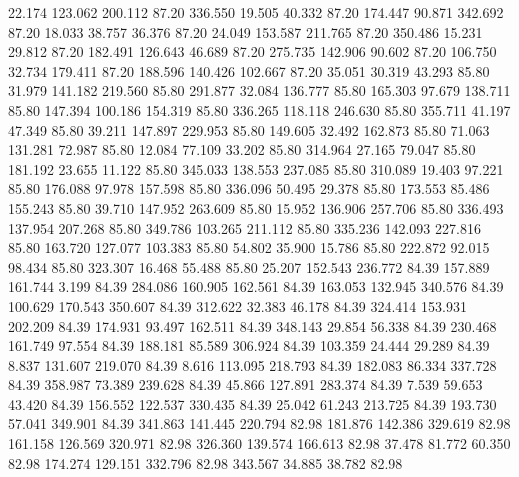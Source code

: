   22.174  123.062  200.112        87.20
 336.550   19.505   40.332        87.20
 174.447   90.871  342.692        87.20
  18.033   38.757   36.376        87.20
  24.049  153.587  211.765        87.20
 350.486   15.231   29.812        87.20
 182.491  126.643   46.689        87.20
 275.735  142.906   90.602        87.20
 106.750   32.734  179.411        87.20
 188.596  140.426  102.667        87.20
  35.051   30.319   43.293        85.80
  31.979  141.182  219.560        85.80
 291.877   32.084  136.777        85.80
 165.303   97.679  138.711        85.80
 147.394  100.186  154.319        85.80
 336.265  118.118  246.630        85.80
 355.711   41.197   47.349        85.80
  39.211  147.897  229.953        85.80
 149.605   32.492  162.873        85.80
  71.063  131.281   72.987        85.80
  12.084   77.109   33.202        85.80
 314.964   27.165   79.047        85.80
 181.192   23.655   11.122        85.80
 345.033  138.553  237.085        85.80
 310.089   19.403   97.221        85.80
 176.088   97.978  157.598        85.80
 336.096   50.495   29.378        85.80
 173.553   85.486  155.243        85.80
  39.710  147.952  263.609        85.80
  15.952  136.906  257.706        85.80
 336.493  137.954  207.268        85.80
 349.786  103.265  211.112        85.80
 335.236  142.093  227.816        85.80
 163.720  127.077  103.383        85.80
  54.802   35.900   15.786        85.80
 222.872   92.015   98.434        85.80
 323.307   16.468   55.488        85.80
  25.207  152.543  236.772        84.39
 157.889  161.744    3.199        84.39
 284.086  160.905  162.561        84.39
 163.053  132.945  340.576        84.39
 100.629  170.543  350.607        84.39
 312.622   32.383   46.178        84.39
 324.414  153.931  202.209        84.39
 174.931   93.497  162.511        84.39
 348.143   29.854   56.338        84.39
 230.468  161.749   97.554        84.39
 188.181   85.589  306.924        84.39
 103.359   24.444   29.289        84.39
   8.837  131.607  219.070        84.39
   8.616  113.095  218.793        84.39
 182.083   86.334  337.728        84.39
 358.987   73.389  239.628        84.39
  45.866  127.891  283.374        84.39
   7.539   59.653   43.420        84.39
 156.552  122.537  330.435        84.39
  25.042   61.243  213.725        84.39
 193.730   57.041  349.901        84.39
 341.863  141.445  220.794        82.98
 181.876  142.386  329.619        82.98
 161.158  126.569  320.971        82.98
 326.360  139.574  166.613        82.98
  37.478   81.772   60.350        82.98
 174.274  129.151  332.796        82.98
 343.567   34.885   38.782        82.98
